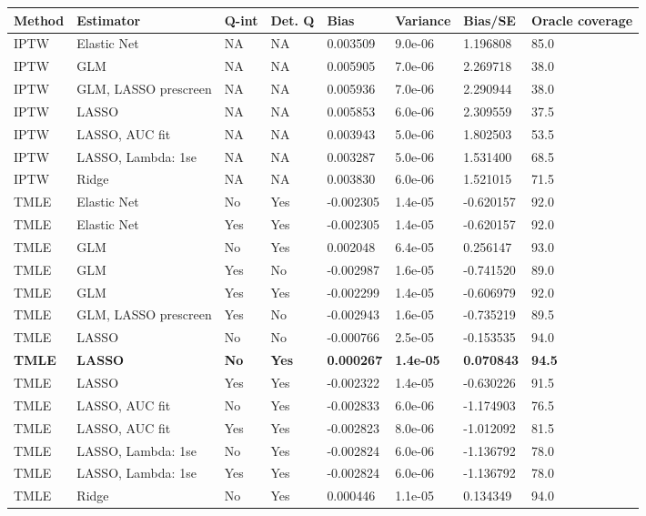 
\begin{longtable}[l]{llllllll}
\toprule
Method & Estimator & Q-int & Det. Q & Bias & Variance & Bias/SE & Oracle coverage\\
\midrule
IPTW & Elastic Net & NA & NA & 0.003509 & 9.0e-06 & 1.196808 & 85.0\\
IPTW & GLM & NA & NA & 0.005905 & 7.0e-06 & 2.269718 & 38.0\\
IPTW & GLM, LASSO prescreen & NA & NA & 0.005936 & 7.0e-06 & 2.290944 & 38.0\\
IPTW & LASSO & NA & NA & 0.005853 & 6.0e-06 & 2.309559 & 37.5\\
IPTW & LASSO, AUC fit & NA & NA & 0.003943 & 5.0e-06 & 1.802503 & 53.5\\
IPTW & LASSO, Lambda: 1se & NA & NA & 0.003287 & 5.0e-06 & 1.531400 & 68.5\\
IPTW & Ridge & NA & NA & 0.003830 & 6.0e-06 & 1.521015 & 71.5\\
TMLE & Elastic Net & No & Yes & -0.002305 & 1.4e-05 & -0.620157 & 92.0\\
TMLE & Elastic Net & Yes & Yes & -0.002305 & 1.4e-05 & -0.620157 & 92.0\\
TMLE & GLM & No & Yes & 0.002048 & 6.4e-05 & 0.256147 & 93.0\\
TMLE & GLM & Yes & No & -0.002987 & 1.6e-05 & -0.741520 & 89.0\\
TMLE & GLM & Yes & Yes & -0.002299 & 1.4e-05 & -0.606979 & 92.0\\
TMLE & GLM, LASSO prescreen & Yes & No & -0.002943 & 1.6e-05 & -0.735219 & 89.5\\
TMLE & LASSO & No & No & -0.000766 & 2.5e-05 & -0.153535 & 94.0\\
\midrule
\textbf{TMLE} & \textbf{LASSO} & \textbf{No} & \textbf{Yes} & \textbf{0.000267} & \textbf{1.4e-05} & \textbf{0.070843} & \textbf{94.5}\\
\midrule
TMLE & LASSO & Yes & Yes & -0.002322 & 1.4e-05 & -0.630226 & 91.5\\
TMLE & LASSO, AUC fit & No & Yes & -0.002833 & 6.0e-06 & -1.174903 & 76.5\\
TMLE & LASSO, AUC fit & Yes & Yes & -0.002823 & 8.0e-06 & -1.012092 & 81.5\\
TMLE & LASSO, Lambda: 1se & No & Yes & -0.002824 & 6.0e-06 & -1.136792 & 78.0\\
TMLE & LASSO, Lambda: 1se & Yes & Yes & -0.002824 & 6.0e-06 & -1.136792 & 78.0\\
TMLE & Ridge & No & Yes & 0.000446 & 1.1e-05 & 0.134349 & 94.0\\
\bottomrule
\end{longtable}
